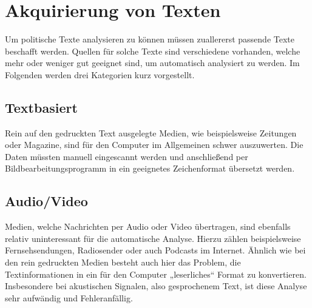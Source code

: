 

\section{Akquirierung von Texten}
Um politische Texte analysieren zu können müssen zuallererst passende Texte beschafft werden. Quellen für solche Texte sind verschiedene vorhanden, welche mehr oder weniger gut geeignet sind, um automatisch analysiert zu werden. Im Folgenden werden drei Kategorien kurz vorgestellt.

\subsection{Textbasiert}
Rein auf den gedruckten Text ausgelegte Medien, wie beispielsweise Zeitungen oder Magazine, sind für den Computer im Allgemeinen schwer auszuwerten. Die Daten müssten manuell eingescannt werden und anschließend per Bildbearbeitungsprogramm in ein geeignetes Zeichenformat übersetzt werden. 

\subsection{Audio/Video}
Medien, welche Nachrichten per Audio oder Video übertragen, sind ebenfalls relativ uninteressant für die automatische Analyse. Hierzu zählen beispielsweise Fernsehsendungen, Radiosender oder auch Podcasts im Internet. Ähnlich wie bei den rein gedruckten Medien besteht auch hier das Problem, die Textinformationen in ein für den Computer „leserliches“ Format zu konvertieren. Insbesondere bei akustischen Signalen, also gesprochenem Text, ist diese Analyse sehr aufwändig und Fehleranfällig. 

